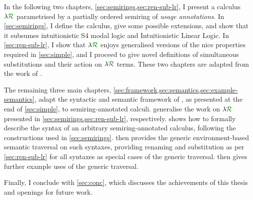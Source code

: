 In the following two chapters, \cref{sec:semirings,sec:ren-sub-lr}, I present a
calculus $\name$ parametrised by a partially ordered semiring of \emph{usage
annotations}.
In \cref{sec:semirings}, I define the calculus, give some possible extensions,
and show that it subsumes intuitionistic S4 modal logic and Intuitionistic
Linear Logic.
In \cref{sec:ren-sub-lr}, I show that $\name$ enjoys generalised versions of the
nice properties required in \cref{sec:simple}, and I proceed to give novel
definitions of simultaneous substitutions and their action on $\name$ terms.
These two chapters are adapted from the work of \citet{WA21}.

The remaining three main chapters,
\cref{sec:framework,sec:semantics,sec:example-semantics}, adapt the syntactic
and semantic framework of \citet{AACMM21}, as presented at the end of
\cref{sec:simple}, to semiring-annotated calculi.
 generalise the work on $\name$ presented in
\cref{sec:semirings,sec:ren-sub-lr}, respectively.
 shows how to formally describe the syntax of an arbitrary
semiring-annotated calculus, following the constructions used in
\cref{sec:semirings}.
 then provides the generic environment-based semantic
traversal on such syntaxes, providing renaming and substitution as per
\cref{sec:ren-sub-lr} for all syntaxes as special cases of the generic
traversal.
 then gives further example uses of the generic traversal.

Finally, I conclude with \cref{sec:conc}, which discusses the achievements of
this thesis and openings for future work.

